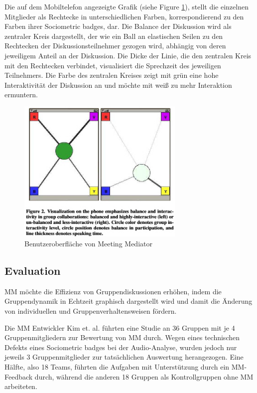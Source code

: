 Die auf dem Mobiltelefon angezeigte Grafik (siehe Figure \ref{display}), stellt
die einzelnen Mitglieder als Rechtecke in unterschiedlichen Farben,
korrespondierend zu den Farben ihrer Sociometric badges, dar. Die Balance der
Diskussion wird als zentraler Kreis dargestellt, der wie ein Ball an elastischen
Seilen zu den Rechtecken der Diskussionsteilnehmer gezogen wird, abhängig von
deren jeweiligem Anteil an der Diskussion. Die Dicke der Linie, die den
zentralen Kreis mit den Rechtecken verbindet, visualisiert die Sprechzeit des
jeweiligen Teilnehmers. Die Farbe des zentralen Kreises zeigt mit grün eine hohe
Interaktivität der Diskussion an und möchte mit weiß zu mehr Interaktion
ermuntern.

\begin{figure}[htp] 
\centering 
\includegraphics[width=8cm]{mm.jpg}
\caption{Benutzeroberfläche von Meeting Mediator
\protect\cite{KimChaHolPent2008}}
\label{display}
\end{figure}


\subsection{Evaluation}
MM möchte die Effizienz von Gruppendiskussionen er\-höh\-en, indem die
Gruppendynamik in Echtzeit graphisch dargestellt wird und damit die Änderung von
 individuellen und Gruppenverhaltensweisen fördern.
 
Die MM Entwickler Kim et. al. führten eine Studie \cite{KimChaHolPent2008} an 36
Gruppen mit je 4 Gruppenmitgliedern zur Bewertung von MM durch. Wegen eines
technischen Defekts eines Sociometric badges bei der Audio-Analyse, wurden
jedoch nur jeweils 3 Gruppenmitglieder zur tatsächlichen Auswertung
herangezogen.
Eine Hälfte, also 18 Teams, führten die Aufgaben mit Unterstützung durch ein
MM-Feedback durch, während die anderen 18 Gruppen als Kontrollgruppen ohne MM
arbeiteten.

